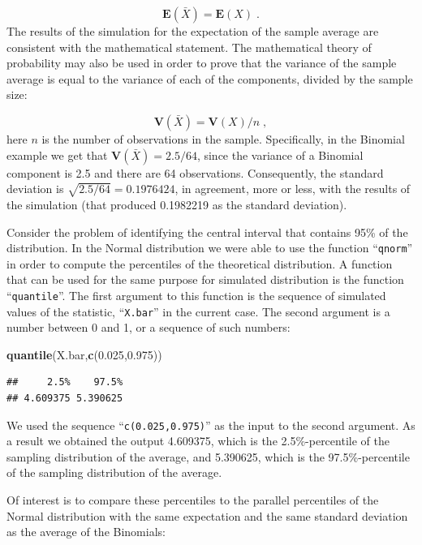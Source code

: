 \documentclass[
]{krantz}
\makeatletter
\newenvironment{Shaded}{\begin{snugshade}}{\end{snugshade}}
\newcommand{\FloatTok}[1]{\textcolor[rgb]{0.00,0.00,0.81}{#1}}
\newcommand{\KeywordTok}[1]{\textcolor[rgb]{0.13,0.29,0.53}{\textbf{#1}}}
\newcommand{\NormalTok}[1]{#1}
\newcommand{\Expec}{\mathbf{E}}
\newcommand{\Var}{\mathbf{V}}
\newenvironment{kframe}{%
\medskip{}
\setlength{\fboxsep}{.8em}
 \def\at@end@of@kframe{}%
 \ifinner\ifhmode%
  \def\at@end@of@kframe{\end{minipage}}%
  \begin{minipage}{\columnwidth}%
 \fi\fi%
 \def\FrameCommand##1{\hskip\@totalleftmargin \hskip-\fboxsep
 \colorbox{shadecolor}{##1}\hskip-\fboxsep
     \hskip-\linewidth \hskip-\@totalleftmargin \hskip\columnwidth}%
 \MakeFramed {\advance\hsize-\width
   \@totalleftmargin\z@ \linewidth\hsize
   \@setminipage}}%
 {\par\unskip\endMakeFramed%
 \at@end@of@kframe}
\renewenvironment{Shaded}{\begin{kframe}}{\end{kframe}}
\theoremstyle{definition}
\theoremstyle{definition}
\theoremstyle{definition}
\theoremstyle{remark}
\makeatother
\begin{document}
\[\Expec(\bar X) = \Expec(X)\;.\] The results of the simulation for the
expectation of the sample average are consistent with the mathematical
statement. The mathematical theory of probability may also be used in
order to prove that the variance of the sample average is equal to the
variance of each of the components, divided by the sample size:

\[\Var(\bar X) = \Var(X)/n\;,\] here \(n\) is the number of observations
in the sample. Specifically, in the Binomial example we get that
\(\Var(\bar X) = 2.5/64\), since the variance of a Binomial component is
2.5 and there are 64 observations. Consequently, the standard deviation
is \(\sqrt{2.5/64} = 0.1976424\), in agreement, more or less, with the
results of the simulation (that produced 0.1982219 as the standard
deviation).

Consider the problem of identifying the central interval that contains
95\% of the distribution. In the Normal distribution we were able to use
the function ``\texttt{qnorm}'' in order to compute the percentiles of the
theoretical distribution. A function that can be used for the same
purpose for simulated distribution is the function ``\texttt{quantile}''. The
first argument to this function is the sequence of simulated values of
the statistic, ``\texttt{X.bar}'' in the current case. The second argument is a
number between 0 and 1, or a sequence of such numbers:

\begin{Shaded}
\begin{Highlighting}[]
\KeywordTok{quantile}\NormalTok{(X.bar,}\KeywordTok{c}\NormalTok{(}\FloatTok{0.025}\NormalTok{,}\FloatTok{0.975}\NormalTok{))}
\end{Highlighting}
\end{Shaded}

\begin{verbatim}
##     2.5%    97.5% 
## 4.609375 5.390625
\end{verbatim}

We used the sequence ``\texttt{c(0.025,0.975)}'' as the input to the second
argument. As a result we obtained the output 4.609375, which is the
2.5\%-percentile of the sampling distribution of the average, and
5.390625, which is the 97.5\%-percentile of the sampling distribution of
the average.

Of interest is to compare these percentiles to the parallel percentiles
of the Normal distribution with the same expectation and the same
standard deviation as the average of the Binomials:
\end{document}
